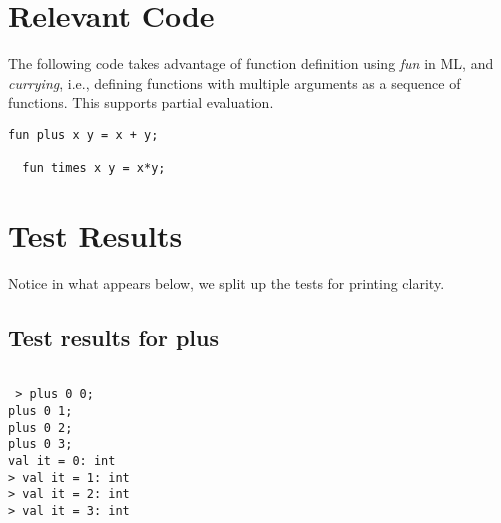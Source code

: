 \documentclass{report}
\begin{document}
\section{Relevant Code}
\label{sec:relevant-code}

The following code takes advantage of function definition using
\emph{fun} in ML, and \emph{currying}, i.e., defining functions with
multiple arguments as a sequence of functions.  This supports partial
evaluation.

\lstset{frameround=fftt}
\begin{lstlisting}[frame=tRBL]
  fun plus x y = x + y;

  fun times x y = x*y;
\end{lstlisting}

\section{Test Results}
\label{sec:tests}

Notice in what appears below, we split up the tests for printing
clarity.
\subsection{Test results for plus}
\label{sec:test-results-plus}


\setcounter{sessioncount}{0}

\begin{session}
  \begin{scriptsize}
\begin{verbatim}

 > plus 0 0;
plus 0 1;
plus 0 2;
plus 0 3;
val it = 0: int
> val it = 1: int
> val it = 2: int
> val it = 3: int
\end{verbatim}
  \end{scriptsize}
\end{session}
\end{document}
